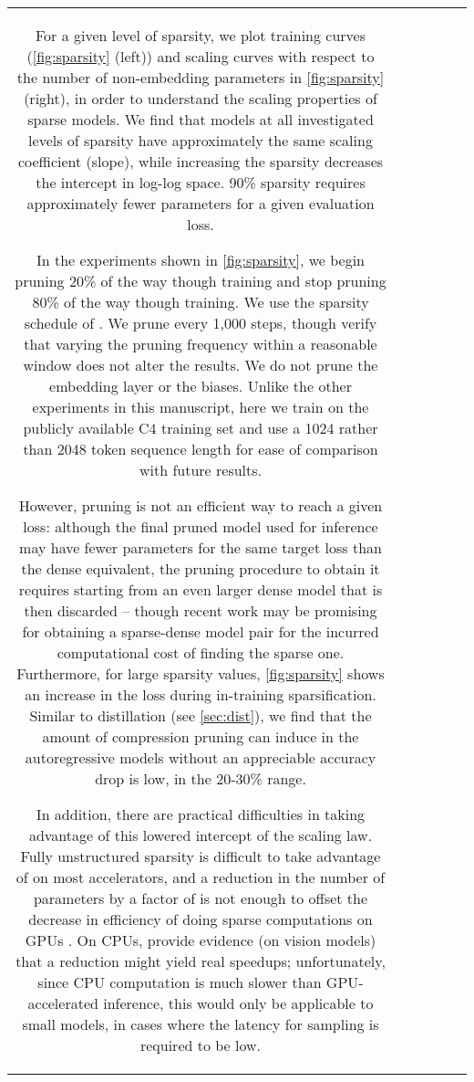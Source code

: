 \documentclass[11pt, a4paper, logo, internal, copyright, nonumbering]{deepmind}
\begin{document}
\begin{center}
\begin{longtable}{cclccc}
{For a given level of sparsity, we plot training curves (\autoref{fig:sparsity} (left)) and scaling curves with respect to the number of non-embedding parameters in \autoref{fig:sparsity} (right), in order to understand the scaling properties of sparse models.
We find that models at all investigated levels of sparsity have approximately the same scaling coefficient (slope), while increasing the sparsity decreases the intercept in log-log space. 90\% sparsity requires approximately  fewer parameters for a given evaluation loss.

In the experiments shown in \autoref{fig:sparsity}, we begin pruning 20\% of the way though training and stop pruning 80\% of the way though training. We use the sparsity schedule of \citet{zhu2017prune}.
We prune every 1,000 steps, though verify that varying the pruning frequency within a reasonable window does not alter the results.
We do not prune the embedding layer or the biases. Unlike the other experiments in this manuscript, here we train on the publicly available C4 training set \citep{raffel2019exploring} and use a 1024 rather than 2048 token sequence length for ease of comparison with future results.

However, pruning is not an efficient way to reach a given loss: although the final pruned model used for inference may have fewer parameters for the same target loss than the dense equivalent, the pruning procedure to obtain it requires starting from an even larger dense model that is then discarded -- though recent work \citep{acdctraining} may be promising for obtaining a sparse-dense model pair for the incurred computational cost of finding the sparse one. Furthermore, for large sparsity values, \autoref{fig:sparsity} shows an increase in the loss during in-training sparsification.
Similar to distillation (see \autoref{sec:dist}), we find that the amount of compression pruning can induce in the autoregressive models without an appreciable accuracy drop is low, in the 20-30\% range. 

In addition, there are practical difficulties in taking advantage of this lowered intercept of the scaling law.
Fully unstructured sparsity is difficult to take advantage of on most accelerators, and a reduction in the number of parameters by a factor of  is not enough to offset the decrease in efficiency of doing sparse computations on GPUs \citep{gpusparsematmul}. On CPUs, \citet{fastsparseconvnets} provide evidence (on vision models) that a  reduction might yield real speedups; unfortunately, since CPU computation is much slower than GPU-accelerated inference, this would only be applicable to small models, in cases where the latency for sampling is required to be low.


}
\end{longtable}
\end{center}
\end{document}

